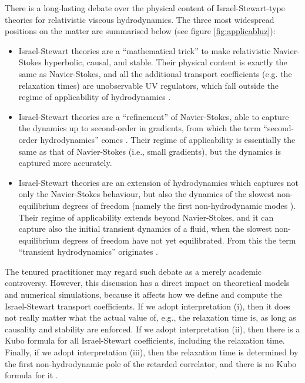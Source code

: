 \documentclass[a4paper, amsfonts, amssymb, amsmath, reprint, showkeys, nofootinbib, twoside, onecolumn,notitlepage]{revtex4-2}
\begin{document}
There is a long-lasting debate over the physical content of Israel-Stewart-type theories \cite{Israel_Stewart_1979,Hishcock1983,OlsonLifsh1990,Baier2008,Denicol2012Boltzmann,GavassinoGENERIC2022} for relativistic viscous hydrodynamics. The three most widespread positions on the matter are summarised below ({see figure \ref{fig:applicabluz}}): 
\begin{itemize}
\item[(i)] Israel-Stewart theories are a ``mathematical trick'' to make relativistic Navier-Stokes hyperbolic, causal, and stable. Their physical content is exactly the same as Navier-Stokes, and all the additional transport coefficients (e.g. the relaxation times) are unobservable UV regulators, which fall outside the regime of applicability of hydrodynamics \cite{Geroch1995,LindblomRelaxation1996,Geroch2001,Kost2000}.
\item[(ii)] Israel-Stewart theories are a ``refinement'' of Navier-Stokes, able to capture the dynamics up to second-order in gradients, from which the term ``second-order hydrodynamics'' comes \cite{Baier2008,Romatschke2017,FlorkowskiReview2018}. Their regime of applicability is essentially the same as that of Navier-Stokes (i.e., small gradients), but the dynamics is captured more accurately.
\item[(iii)] Israel-Stewart theories are an extension of hydrodynamics which captures not only the Navier-Stokes behaviour, but also the dynamics of the slowest non-equilibrium degrees of freedom (namely the first non-hydrodynamic modes \cite{Denicol_Relaxation_2011,Grozdanov2013,GavassinoNonHydro2022,GavassinoFronntiers2021}). Their regime of applicability extends beyond Navier-Stokes, and it can capture also the initial transient dynamics of a fluid, when the slowest non-equilibrium degrees of freedom have not yet equilibrated. From this the term ``transient hydrodynamics'' originates \cite{Israel_Stewart_1979,Denicol2012Boltzmann}. 
\end{itemize}
The tenured practitioner may regard such debate as a merely academic controversy. However, this discussion has a direct impact on theoretical models and numerical simulations, because it affects how we define and compute the Israel-Stewart transport coefficients. If we adopt interpretation (i), then it does not really matter what the actual value of, e.g., the relaxation time is, as long as causality and stability are enforced. If we adopt interpretation (ii), then there is a Kubo formula for all Israel-Stewart coefficients, including the relaxation time. Finally, if we adopt interpretation (iii), then the relaxation time is determined by the first non-hydrodynamic pole of the retarded correlator, and there is no Kubo formula for it \cite{Denicol_Relaxation_2011}.
\end{document}
